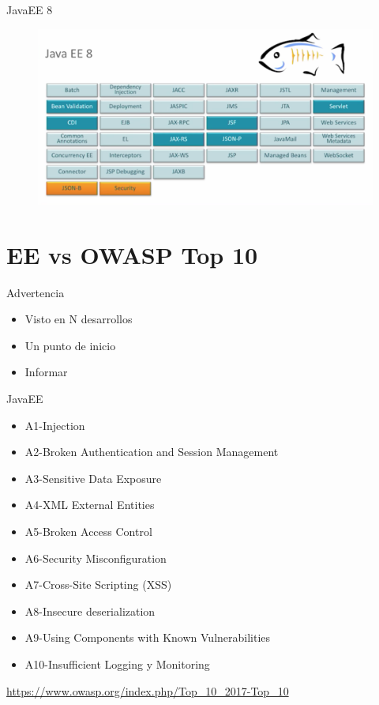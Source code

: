 \documentclass{beamer}
\begin{document}
\begin{frame}{JavaEE 8}
\begin{figure}
	\centering
	\includegraphics[width=0.9\linewidth]{Images/javaee8}
\end{figure}
\end{frame}


\section{EE vs OWASP Top 10}

\begin{frame}{Advertencia}
\begin{itemize}
	\item Visto en N desarrollos
	\item Un punto de inicio
	\item Informar
\end{itemize}
\end{frame}

\begin{frame}{JavaEE}
\begin{itemize}
	\item A1-Injection
	\item A2-Broken Authentication and Session Management
	\item A3-Sensitive Data Exposure
	\item A4-XML External Entities
	\item A5-Broken Access Control
	\item A6-Security Misconfiguration
	\item A7-Cross-Site Scripting (XSS)
	\item A8-Insecure deserialization
	\item A9-Using Components with Known Vulnerabilities
	\item A10-Insufficient Logging y Monitoring
\end{itemize}
\url{https://www.owasp.org/index.php/Top_10_2017-Top_10}
\end{frame}
\end{document}

